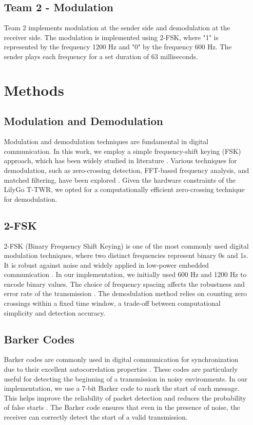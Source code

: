 \subsection{Team 2 - Modulation}
Team 2 implements modulation at the sender side and demodulation at the receiver side. The modulation is implemented using 2-FSK, where "1" is represented by the frequency 1200 Hz and "0" by the frequency 600 Hz. The sender plays each frequency for a set duration of 63 milliseconds.


\section{Methods}

\subsection{Modulation and Demodulation}

Modulation and demodulation techniques are fundamental in digital communication. In this work, we employ a simple frequency-shift keying (FSK) approach, which has been widely studied in literature \cite{sklar2001digital}. Various techniques for demodulation, such as zero-crossing detection, FFT-based frequency analysis, and matched filtering, have been explored \cite{proakis2001digital}. Given the hardware constraints of the LilyGo T-TWR, we opted for a computationally efficient zero-crossing technique for demodulation.

\subsection{2-FSK}

2-FSK (Binary Frequency Shift Keying) is one of the most commonly used digital modulation techniques, where two distinct frequencies represent binary 0s and 1s. It is robust against noise and widely applied in low-power embedded communication \cite{anderson1995fsk}. In our implementation, we initially used 600 Hz and 1200 Hz to encode binary values. The choice of frequency spacing affects the robustness and error rate of the transmission \cite{feher1983wireless}. The demodulation method relies on counting zero crossings within a fixed time window, a trade-off between computational simplicity and detection accuracy.

\subsection{Barker Codes}

Barker codes are commonly used in digital communication for synchronization due to their excellent autocorrelation properties \cite{golomb1961barker}. These codes are particularly useful for detecting the beginning of a transmission in noisy environments. In our implementation, we use a 7-bit Barker code to mark the start of each message. This helps improve the reliability of packet detection and reduces the probability of false starts \cite{turin1974barker}. The Barker code ensures that even in the presence of noise, the receiver can correctly detect the start of a valid transmission.

